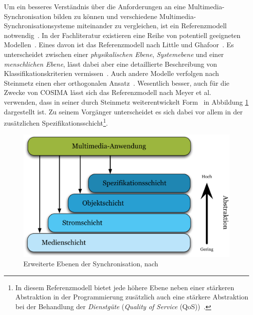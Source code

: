   Um ein besseres Verständnis über die Anforderungen an eine Multimedia-Synchronisation bilden zu können und verschiedene Multimedia-Synchronisationsysteme miteinander zu vergleichen, ist ein Referenzmodell notwendig~\citep[S. 601]{multimedia_technologie}. In der Fachliteratur existieren eine Reihe von potentiell geeigneten Modellen~\citep[S. 601]{multimedia_technologie}. Eines davon ist das Referenzmodell nach Little und Ghafoor~\citep{little1991ms}. Es unterscheidet zwischen einer \emph{physikalischen Ebene}, \emph{Systemebene} und einer \emph{menschlichen Ebene}, lässt dabei aber eine detaillierte Beschreibung von Klassifikationskriterien vermissen~\citep[S. 601]{multimedia_technologie}. Auch andere Modelle verfolgen nach Steinmetz einen eher orthogonalen Ansatz~\citep[S. 601]{multimedia_technologie}. Wesentlich besser, auch für die Zwecke von COSIMA lässt sich das Referenzmodell nach Meyer et al.~\citep{meyer1993tms} verwenden, dass in seiner durch Steinmetz weiterentwickelt Form~\citep{steinmetz1995mcc} in Abbildung \ref{fig:images_Erweiterte_Synchronisations-Ebenen} dargestellt ist. Zu seinem Vorgänger unterscheidet es sich dabei vor allem in der zusätzlichen Spezifikationsschicht\footnote{In diesem Referenzmodell bietet jede höhere Ebene neben einer stärkeren Abstraktion in der Programmierung zusätzlich auch eine stärkere Abstraktion bei der Behandlung der \emph{Dienstgüte} (\emph{Quality of Service} (QoS))~\citep[S. 601]{steinmetz1995mcc}.}.

  \begin{figure}[!ht]
    \centering
      \includegraphics[width=.9\textwidth]{images/Erweiterte_Synchronisations-Ebenen.pdf}
    \caption{Erweiterte Ebenen der Synchronisation, nach~\citep[S. 601]{steinmetz1995mcc}}
    \label{fig:images_Erweiterte_Synchronisations-Ebenen}
  \end{figure}
  
